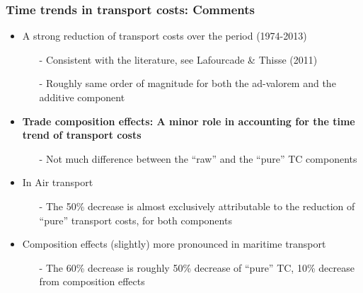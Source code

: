 \documentclass[10 pt,Helvetica, french]{beamer}
\begin{document}
\begin{frame}
\frametitle{Time trends in transport costs: Comments} %
\begin{itemize}
\item A strong reduction of transport costs over the period (1974-2013) \vspace{0.1cm}
\begin{itemize}
\footnotesize
\item[-] Consistent with the literature, see Lafourcade \& Thisse (2011) \vspace{0.1cm}
\item[-] Roughly same order of magnitude for both the ad-valorem and the additive component  \vspace{0.1cm}
\normalsize
\end{itemize}
\pause

\item \textbf{Trade composition effects: A minor role in accounting for the time trend of transport costs}\vspace{0.1cm}
\begin{itemize}
\footnotesize
\item[-] Not much difference between the ``raw'' and the ``pure'' TC components \vspace{0.1cm}
\normalsize
\end{itemize}
\pause
\item In Air transport \vspace{0.1cm}
\begin{itemize}
\footnotesize
\item[-] The 50\% decrease is almost exclusively attributable to the reduction of ``pure'' transport costs, for both components  \vspace{0.1cm}
\end{itemize}
\normalsize
\item Composition effects (slightly) more pronounced in maritime transport \vspace{0.1cm}
\begin{itemize}
\footnotesize
\item[-] The 60\% decrease is roughly 50\% decrease of ``pure'' TC, 10\% decrease from composition effects \vspace{0.1cm}
\end{itemize}
\normalsize
\end{itemize}
\end{frame}
\end{document}
